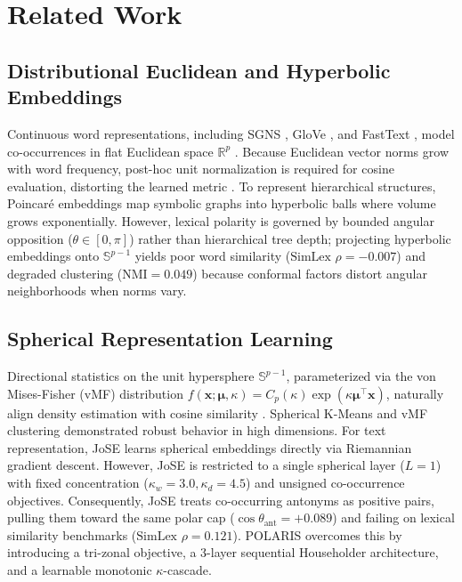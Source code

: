 \documentclass[journal]{IEEEtran}
\begin{document}
\section{Related Work}

\subsection{Distributional Euclidean and Hyperbolic Embeddings}
Continuous word representations, including SGNS \cite{mikolov2013distributed}, GloVe \cite{pennington2014glove}, and FastText \cite{bojanowski2017enriching}, model co-occurrences in flat Euclidean space $\mathbb{R}^p$ \cite{levy2014neural}. Because Euclidean vector norms grow with word frequency, post-hoc unit normalization is required for cosine evaluation, distorting the learned metric \cite{xing2015normalized,meng2019spherical}. To represent hierarchical structures, Poincar\'{e} embeddings \cite{nickel2017poincare,nickel2018learning,tifrea2018poincare} map symbolic graphs into hyperbolic balls where volume grows exponentially. However, lexical polarity is governed by bounded angular opposition ($\theta \in [0, \pi]$) rather than hierarchical tree depth; projecting hyperbolic embeddings onto $\mathbb{S}^{p-1}$ yields poor word similarity ($\text{SimLex } \rho = -0.007$) and degraded clustering ($\text{NMI} = 0.049$) because conformal factors distort angular neighborhoods when norms vary.

\subsection{Spherical Representation Learning}
Directional statistics on the unit hypersphere $\mathbb{S}^{p-1}$, parameterized via the von Mises-Fisher (vMF) distribution $f(\mathbf{x}; \boldsymbol{\mu}, \kappa) = C_p(\kappa) \exp(\kappa \boldsymbol{\mu}^\top \mathbf{x})$, naturally align density estimation with cosine similarity \cite{banerjee2005clustering,mardia2000directional}. Spherical K-Means \cite{dhillon2001concept} and vMF clustering \cite{gopal2014von,davidson2018hyperspherical,wang2020understanding} demonstrated robust behavior in high dimensions. For text representation, JoSE \cite{meng2019spherical} learns spherical embeddings directly via Riemannian gradient descent. However, JoSE is restricted to a single spherical layer ($L=1$) with fixed concentration ($\kappa_w = 3.0, \kappa_d = 4.5$) and unsigned co-occurrence objectives. Consequently, JoSE treats co-occurring antonyms as positive pairs, pulling them toward the same polar cap ($\cos\theta_{\text{ant}} = +0.089$) and failing on lexical similarity benchmarks ($\text{SimLex } \rho = 0.121$). POLARIS overcomes this by introducing a tri-zonal objective, a 3-layer sequential Householder architecture, and a learnable monotonic $\kappa$-cascade.
\end{document}
